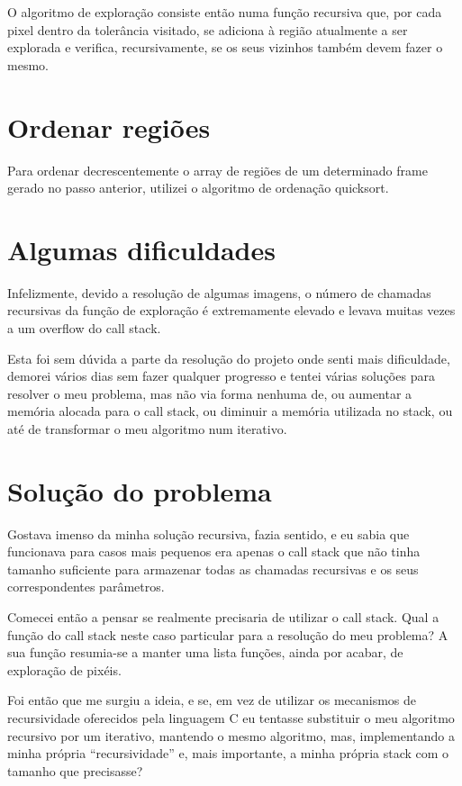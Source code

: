 \documentclass{article}
\begin{document}
O algoritmo de exploração consiste então numa função recursiva que, por cada pixel dentro da tolerância visitado, se adiciona à região atualmente a ser explorada e verifica, recursivamente, se os seus vizinhos também devem fazer o mesmo.

\section{Ordenar regiões}

Para ordenar decrescentemente o array de regiões de um determinado frame gerado no passo anterior, utilizei o algoritmo de ordenação quicksort.

\pagebreak
\section{Algumas dificuldades}

Infelizmente, devido a resolução de algumas imagens, o número de chamadas recursivas da função de exploração é extremamente elevado e levava muitas vezes a um overflow do call stack. 

Esta foi sem dúvida a parte da resolução do projeto onde senti mais dificuldade, demorei vários dias sem fazer qualquer progresso e tentei várias soluções para resolver o meu problema, mas não via forma nenhuma de, ou aumentar a memória alocada para o call stack, ou diminuir a memória utilizada no stack, ou até de transformar o meu algoritmo num iterativo. 

\section{Solução do problema}

Gostava imenso da minha solução recursiva, fazia sentido, e eu sabia que funcionava para casos mais pequenos era apenas o call stack que não tinha tamanho suficiente para armazenar todas as chamadas recursivas e os seus correspondentes parâmetros.

Comecei então a pensar se realmente precisaria de utilizar o call stack. Qual a função do call stack neste caso particular para a resolução do meu problema? A sua função resumia-se a manter uma lista funções, ainda por acabar, de exploração de pixéis.

Foi então que me surgiu a ideia, e se, em vez de utilizar os mecanismos de recursividade oferecidos pela linguagem C eu tentasse substituir o meu algoritmo recursivo por um iterativo, mantendo o mesmo algoritmo, mas, implementando a minha própria “recursividade” e, mais importante, a minha própria stack com o tamanho que precisasse?
\end{document}
